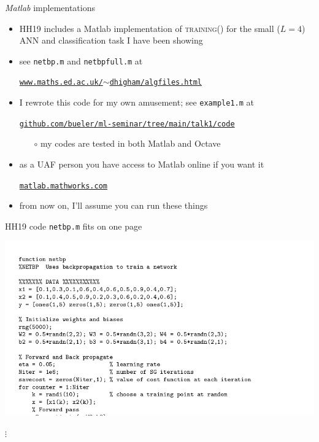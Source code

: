 \documentclass[xcolor={svgnames},
               hyperref={colorlinks,citecolor=DeepPink4,linkcolor=FireBrick,urlcolor=Maroon}]
               {beamer}
\begin{document}
\begin{frame}{\emph{Matlab} implementations}

\begin{itemize}
\item HH19 includes a Matlab implementation of \textsc{training()} for the small ($L=4$) ANN and classification task I have been showing
\item see \texttt{netbp.m} and \texttt{netbpfull.m} at

\begin{center} \small
\href{https://www.maths.ed.ac.uk/~dhigham/algfiles.html}{\texttt{www.maths.ed.ac.uk/$\sim$dhigham/algfiles.html}}
\end{center}
\item I rewrote this code for my own amusement; see \texttt{example1.m} at

\begin{center} \small
\href{https://github.com/bueler/ml-seminar/tree/main/talk1/code}{\texttt{github.com/bueler/ml-seminar/tree/main/talk1/code}}
\end{center}
    \begin{itemize}
    \item[$\circ$] my codes are tested in both Matlab and Octave
    \end{itemize}

\bigskip\bigskip
\item as a UAF person you have access to Matlab online if you want it

\begin{center} \small
\href{https://matlab.mathworks.com/}{\texttt{matlab.mathworks.com}}
\end{center}
\item from now on, I'll assume you can run these things
\end{itemize}
\end{frame}


\begin{frame}{HH19 code \texttt{netbp.m} fits on one page}

\includegraphics[width=1.05\textwidth]{figs/netbp}

\hfill $\vdots$ \hfill \phantom{fokladfksda fadsj adfskjo}
\end{frame}
\end{document}
